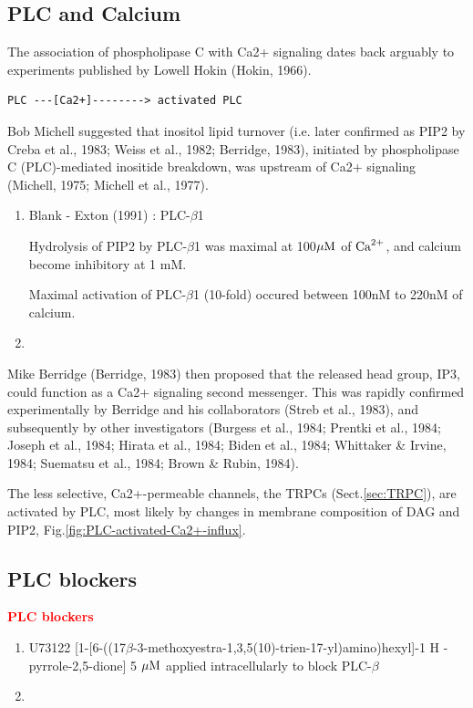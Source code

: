 \subsection{PLC and Calcium}
\label{sec:PLC-Calcium}

The association of phospholipase C with Ca2+ signaling dates back arguably to
experiments published by Lowell Hokin (Hokin, 1966). 
\begin{verbatim}
PLC ---[Ca2+]--------> activated PLC
\end{verbatim}
Bob Michell suggested that inositol lipid turnover (i.e. later confirmed as PIP2
by Creba et al., 1983; Weiss et al., 1982; Berridge, 1983), initiated by
phospholipase C (PLC)-mediated inositide breakdown, was upstream of Ca2+
signaling (Michell, 1975; Michell et al., 1977). 


\begin{enumerate}
  \item Blank - Exton (1991) : PLC-$\beta$1 

Hydrolysis of PIP2 by PLC-$\beta$1 was maximal at 100${\mu\text{M}}$ of ${\text{Ca}^{2+}}$, and
calcium become inhibitory at 1 mM. 

Maximal activation of PLC-$\beta$1 (10-fold) occured between 100nM to 220nM of
calcium.
  
  \item 
\end{enumerate}

Mike Berridge (Berridge, 1983) then proposed that the released head group, IP3,
could function as a Ca2+ signaling second messenger. This was rapidly confirmed
experimentally by Berridge and his collaborators (Streb et al., 1983), and
subsequently by other investigators (Burgess et al., 1984; Prentki et al., 1984;
Joseph et al., 1984; Hirata et al., 1984; Biden et al., 1984; Whittaker \&
Irvine, 1984; Suematsu et al., 1984; Brown \& Rubin, 1984).

The less selective, Ca2+-permeable channels, the TRPCs (Sect.\ref{sec:TRPC}),
are activated by PLC, most likely by changes in membrane composition of DAG and
PIP2, Fig.\ref{fig:PLC-activated-Ca2+-influx}.
	

\subsection{PLC blockers}

\textcolor{red}{\bf PLC blockers}
\begin{enumerate}
  \item U73122 
  [1-[6-((17$\beta$-3-methoxyestra-1,3,5(10)-trien-17-yl)amino)hexyl]-1 H -
  pyrrole-2,5-dione] 5 ${\mu\text{M}}$ applied intracellularly to block PLC-$\beta$
  
  \item 
\end{enumerate}

